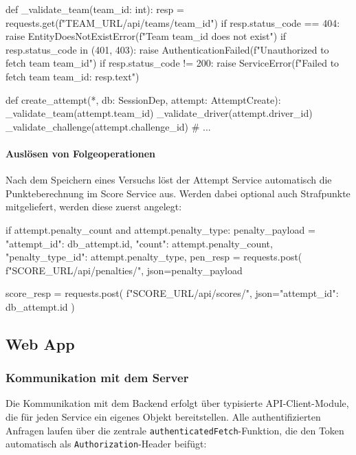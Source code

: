 \begin{CodeBox}[language=Python, caption={Validierung von Fremdbeziehungen vor dem Speichern}]
def _validate_team(team_id: int):
    resp = requests.get(f"{TEAM_URL}/api/teams/{team_id}")
    if resp.status_code == 404:
        raise EntityDoesNotExistError(f"Team {team_id} does not exist")
    if resp.status_code in (401, 403):
        raise AuthenticationFailed(f"Unauthorized to fetch team {team_id}")
    if resp.status_code != 200:
        raise ServiceError(f"Failed to fetch team {team_id}: {resp.text}")

def create_attempt(*, db: SessionDep, attempt: AttemptCreate):
    _validate_team(attempt.team_id)
    _validate_driver(attempt.driver_id)
    _validate_challenge(attempt.challenge_id)
    # ...
\end{CodeBox}

\paragraph{Auslösen von Folgeoperationen}

Nach dem Speichern eines Versuchs löst der Attempt Service 
automatisch die Punkteberechnung im Score Service aus. 
Werden dabei optional auch Strafpunkte mitgeliefert, werden 
diese zuerst angelegt:

\begin{CodeBox}[language=Python]
if attempt.penalty_count and attempt.penalty_type:
    penalty_payload = {
        "attempt_id":    db_attempt.id,
        "count":         attempt.penalty_count,
        "penalty_type_id": attempt.penalty_type,
    }
    pen_resp = requests.post(
        f"{SCORE_URL}/api/penalties/", json=penalty_payload

score_resp = requests.post(
    f"{SCORE_URL}/api/scores/",
    json={"attempt_id": db_attempt.id}
)
\end{CodeBox}

\subsection{Web App}
\label{sec:impl_webapp}

\subsubsection{Kommunikation mit dem Server}
\label{sec:impl_webapp_api}

Die Kommunikation mit dem Backend erfolgt über typisierte 
API-Client-Module, die für jeden Service ein eigenes Objekt 
bereitstellen. Alle authentifizierten Anfragen laufen über 
die zentrale \texttt{authenticatedFetch}-Funktion, die den 
Token automatisch als \texttt{Authorization}-Header 
beifügt:

